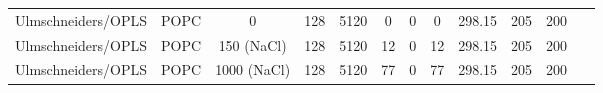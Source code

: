 \documentclass[pre,aps,floatfix,authordate1-4,twocolumn]{revtex4-1}
\begin{document}
\begin{table}[htb]
\begin{tabular}{c c c c c c c c c c c c}
  \hline
  Ulmschneiders/OPLS\cite{??}       &   POPC & 0          & 128 & 5120 & 0 & 0  & 0 & 298.15 & 205 & 200 &~\cite{ulmschneiderPOPC0mMNaClfiles}  \\
  Ulmschneiders/OPLS\cite{??}       &   POPC & 150 (NaCl) & 128 & 5120 & 12 & 0  & 12 & 298.15 & 205 & 200 &~\cite{ulmschneiderPOPC150mMNaClfiles}  \\
  Ulmschneiders/OPLS\cite{??}       &   POPC & 1000 (NaCl) & 128 & 5120 & 77 & 0  & 77 & 298.15 & 205 & 200 &~\cite{ulmschneiderPOPC1000mMNaClfiles}  \\
\end{tabular}
\end{table} 


\end{document}

